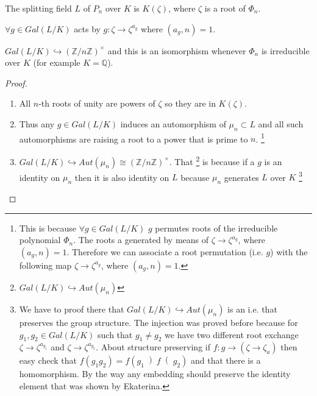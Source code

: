 \begin{theorem}
  The splitting field $L$ of $P_n$ over $K$ is $K\left(\zeta\right)$,
  where $\zeta$ is a root of $\Phi_n$.

  $\forall g \in Gal\left(L/K\right)$ acts by $g: \zeta \to
  \zeta^{a_g}$ where $\left(a_g, n\right) = 1$.

  $Gal\left(L/K\right)  \hookrightarrow
  \left(\mathbb{Z}/n\mathbb{Z}\right)^\times$ and this is an isomorphism
  whenever $\Phi_n$ is irreducible over $K$ (for example $K
  =\mathbb{Q}$). 
  \begin{proof}
    \begin{enumerate}
      \item All $n$-th roots of unity are powers of $\zeta$ so they
        are in  $K\left(\zeta\right)$.
      \item Thus any $g \in Gal\left(L/K\right)$ induces an
        automorphism of $\mu_n \subset L$ and all such automorphisms
        are raising a root to a power that is prime to $n$.
        \footnote{
          This is because $\forall g \in Gal\left(L/K\right)$
          $g$ permutes roots of the irreducible polynomial
          $\Phi_n$. The roots a generated by means of $\zeta \to
          \zeta^{a_g}$, where $\left(a_g, n\right) = 1$. Therefore
          we can associate a root permutation (i.e. $g$) with the
          following map $\zeta \to
          \zeta^{a_g}$, where $\left(a_g, n\right) = 1$.
        }
      \item $Gal\left(L/K\right)  \hookrightarrow
        Aut\left(\mu_n\right) \cong 
        \left(\mathbb{Z}/n\mathbb{Z}\right)^\times$. That
        \footnote{
          $Gal\left(L/K\right)  \hookrightarrow
          Aut\left(\mu_n\right)$
        }
        is because if a $g$ is an identity on $\mu_n$ then it is also
        identity on $L$ because $\mu_n$ generates $L$ over $K$
        \footnote{
          We have to proof there that $Gal\left(L/K\right)  \hookrightarrow
          Aut\left(\mu_n\right)$ is an 
          i.e.  that preserves the group
          structure. The injection was proved before because for
          $g_1,g_2 \in Gal\left(L/K\right)$ such that $g_1 \ne g_2$ we
          have two different root exchange $\zeta \to \zeta^{a_{g_1}}$ and
          $\zeta \to \zeta^{a_{g_2}}$. About structure preserving if
          $f: g \to \left(\zeta \to \zeta_a\right)$ then easy check
          that $f\left(g_1 g_2\right) = f\left(g_1 \left) f\right(
          g_2\right)$ and that there is a homomorphism. By the way any
          embedding should preserve the identity element that was
          shown by Ekaterina.

}
\end{enumerate}
\end{proof}
\end{theorem}
